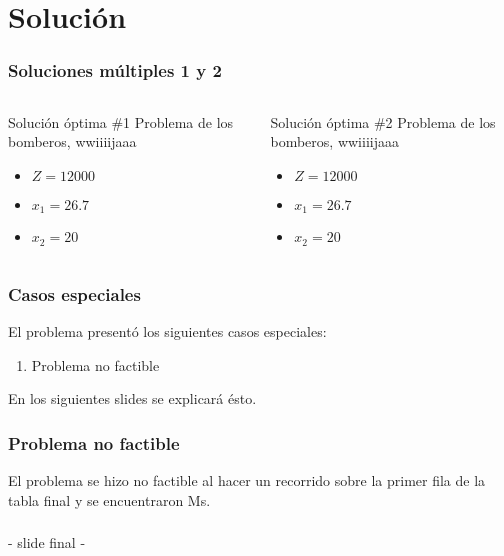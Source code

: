 \documentclass{beamer}
\begin{document}
\section{Solución} 
\begin{frame} 
\frametitle{Soluciones múltiples 1 y 2} 
\begin{columns}
\begin{column}{0.5\textwidth}
\begin{exampleblock}{Solución óptima \#1} 
{\scriptsize Problema de los bomberos, wwiiiijaaa}
\begin{itemize} 
\item $Z = 12000$ 
\item $x_{1} = 26.7$ 
\item $x_{2} = 20$ 
\end{itemize} 
\end{exampleblock} 
\end{column}
\begin{column}{0.5\textwidth}
\begin{exampleblock}{Solución óptima \#2} 
{\scriptsize Problema de los bomberos, wwiiiijaaa}
\begin{itemize} 
\item $Z = 12000$ 
\item $x_{1} = 26.7$ 
\item $x_{2} = 20$ 
\end{itemize} 
\end{exampleblock} 
\end{column}
\end{columns}
\end{frame} 



\begin{frame} 
\frametitle{Casos especiales} 
\begin{exampleblock}{} 
El problema presentó los siguientes casos especiales: 
\begin{enumerate} 
\item Problema no factible  
\end{enumerate} 
\end{exampleblock} 
En los siguientes slides se explicará ésto. 
\end{frame} 


\begin{frame} 
\frametitle{Problema no factible} 
El problema se hizo no factible al hacer un recorrido sobre la primer fila de la tabla final y se encuentraron Ms.
\end{frame} 

\begin{frame}\frametitle{}\begin{center}{\Huge - slide final -}\end{center}\end{frame} 
\end{document}
